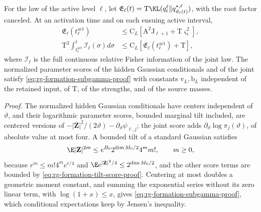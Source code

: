 For the law of the active level \(\ell\), let
\(\mathfrak E_\ell(t)=\mathrm T\KL(q_t^\ell\Vert q^{\star,\ell}_{\vartheta_\ell(t)})\),
with the root factor canceled. At an activation time and on each ensuing
active interval,
\begin{align}
 \mathfrak E_\ell(t^{\mathrm{act}}_\ell)&\le \mathrm C_L[\mathrm A^2\mathrm J_{\ell+1}+\mathrm T\varsigma_\epsilon^2],
 \label{eq:rg-formation-activation-budget}\\
 \mathrm T^2\int_{t^{\mathrm{act}}_\ell}^{t}\mathcal I_\ell(\sigma) d\sigma
 &\le \mathrm C_L[\mathfrak E_\ell(t^{\mathrm{act}}_\ell)+\mathrm T],
 \label{eq:rg-formation-full-fisher-budget}
\end{align}
where \(\mathcal I_\ell\) is the full continuous relative Fisher information of
the joint law. The normalized parameter scores of the hidden Gaussian
conditionals and of the joint satisfy \cref{eq:rg-formation-subgamma-proof}
with constants \(\mathrm v_L,\mathrm b_L\) independent of the retained input,
of \(\mathrm T\), of the strengths, and of the source masses.

\noindent\emph{Proof.}
The normalized hidden Gaussian conditionals have centers independent of
\(\vartheta\), and their logarithmic parameter scores, bounded marginal tilt
included, are centered versions of
\(-|\mathbf Z|^2/(2\vartheta)-\partial_\vartheta\psi_{\ell,j}\); the joint score
adds \(\partial_\vartheta\log\pi_j(\vartheta)\), of absolute value at most four.
A bounded tilt of a standard Gaussian satisfies
\begin{equation}
 \E|\mathbf Z|^{2m}
 \le e^{B_0}2^{\dim M_0/2}4^m m!,\qquad m\ge0,
 \label{eq:rg-formation-gaussian-score-moments}
\end{equation}
because \(r^m\le m!4^me^{r/4}\) and
\(\E e^{|\mathbf Z|^2/4}\le2^{\dim M_0/2}\), and the other score terms are
bounded by \cref{eq:rg-formation-tilt-score-proof}. Centering at most doubles
a geometric moment constant, and summing the exponential series without its
zero linear term, with \(\log(1+x)\le x\), gives
\cref{eq:rg-formation-subgamma-proof}, which conditional expectations keep by
Jensen's inequality.

